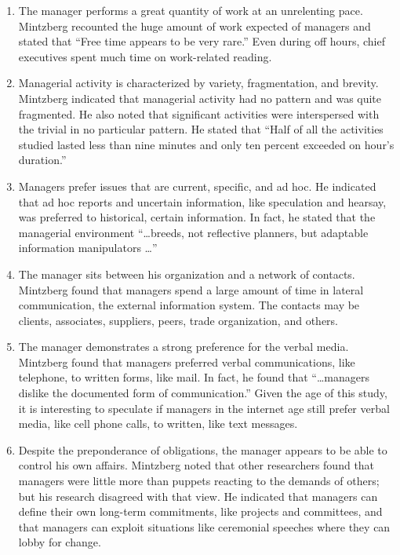 \begin{enumerate}
	\item The manager performs a great quantity of work at an unrelenting pace. Mintzberg recounted the huge amount of work expected of managers and stated that ``Free time appears to be very rare.'' Even during off hours, chief executives spent much time on work-related reading.
	\item Managerial activity is characterized by variety, fragmentation, and brevity. Mintzberg indicated that managerial activity had no pattern and was quite fragmented. He also noted that significant activities were interspersed with the trivial in no particular pattern. He stated that ``Half of all the activities studied lasted less than nine minutes and only ten percent exceeded on hour's duration.''
	\item Managers prefer issues that are current, specific, and ad hoc. He indicated that ad hoc reports and uncertain information, like speculation and hearsay, was preferred to historical, certain information. In fact, he stated that the managerial environment ``\ldots breeds, not reflective planners, but adaptable information manipulators \ldots''
	\item The manager sits between his organization and a network of contacts. Mintzberg found that managers spend a large amount of time in lateral communication, the external information system. The contacts may be clients, associates, suppliers, peers, trade organization, and others. 
	\item The manager demonstrates a strong preference for the verbal media. Mintzberg found that managers preferred verbal communications, like telephone, to written forms, like mail. In fact, he found that ``\ldots managers dislike the documented form of communication.'' Given the age of this study, it is interesting to speculate if managers in the internet age still prefer verbal media, like cell phone calls, to written, like text messages.
	\item Despite the preponderance of obligations, the manager appears to be able to control his own affairs. Mintzberg noted that other researchers found that managers were little more than puppets reacting to the demands of others; but his research disagreed with that view. He indicated that managers can define their own long-term commitments, like projects and committees, and that managers can exploit situations like ceremonial speeches where they can lobby for change.
\end{enumerate}

